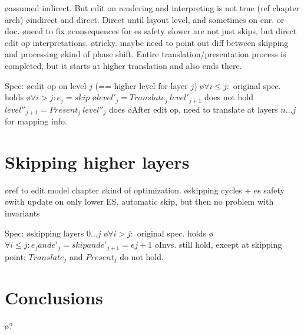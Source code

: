 \bl
\o assumed indirect. But edit on rendering and interpreting is not true (ref chapter arch) 
\o indirect and direct. Direct until layout level, and sometimes on enr. or doc.
\o need to fix
\o consequences for es safety
\o lower are not just skips, but direct edit op interpretations.
\o tricky. maybe need to point out diff between skipping and processing
\o kind of phase shift. Entire translation/presentation process is completed, but it starts at higher translation and also ends there.
\el

Spec:
\bl
\o edit op on level $j$ (== higher level for layer $j$)
\o $\forall i\le j:$ original spec. holds
\o $\forall i>j: e_j = skip$ 
\o $level'_j = Translate_j~level'_{j+1}$ does not hold $level''_{j+1} = Present_j~level''_j$ does
\o After edit op, need to translate at layers $n\dots j$ for mapping info.
\el 
\section{Skipping higher layers} \label{sect:specSkipLayers}
\bl
\o ref to edit model chapter
\o kind of optimization. 
\o skipping cycles + es safety
\o with update on only lower ES, automatic skip, but then no problem with invariants
\el

Spec:
\bl
\o skipping layers $0\dots j$
\o $\forall i>j:$ original spec. holds
\o $\forall i\le j: e_j and e'_j = skip and e'_{j+1} = e{j+1}$  
\o Invs. still hold, except at skipping point: $Translate_j$ and $Present_j$ do not hold.
\el

\section{Conclusions}

\bl
\o ?
\el




